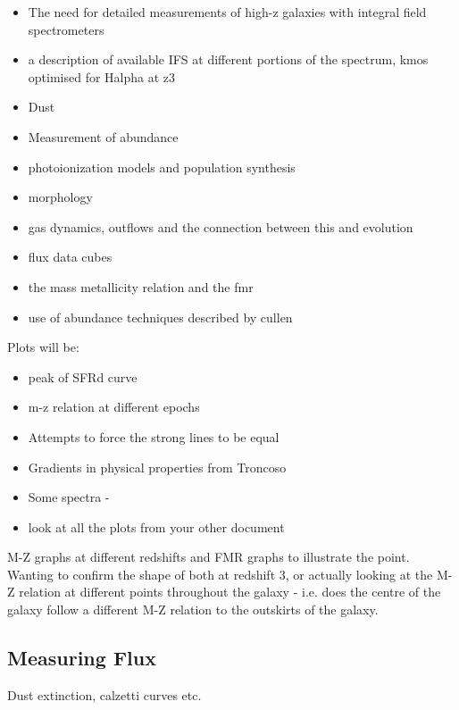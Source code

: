 \documentclass{literature}
\begin{document}
\begin{itemize}
	\item The need for detailed measurements of high-z galaxies with integral field spectrometers 
	\item a description of available IFS at different portions of the spectrum, kmos optimised for Halpha at z3
	\item Dust
	\item Measurement of abundance 
	\item photoionization models and population synthesis
	\item morphology 
	\item gas dynamics, outflows and the connection between this and evolution 
	\item flux data cubes 
	\item the mass metallicity relation and the fmr 
	\item use of abundance techniques described by cullen 
\end{itemize}

Plots will be: 

\begin{itemize}
	\item peak of SFRd curve 
	\item m-z relation at different epochs 
	\item Attempts to force the strong lines to be equal 
	\item Gradients in physical properties from Troncoso
	\item Some spectra -  
	\item look at all the plots from your other document 
\end{itemize}



M-Z graphs at different redshifts and FMR graphs to illustrate the point. Wanting to confirm the shape of both at redshift 3, or actually looking at the M-Z relation at different points throughout the galaxy - i.e. does the centre of the galaxy follow a different M-Z relation to the outskirts of the galaxy. 

\subsection{Measuring Flux}
Dust extinction, calzetti curves etc. 

 
\end{document}
